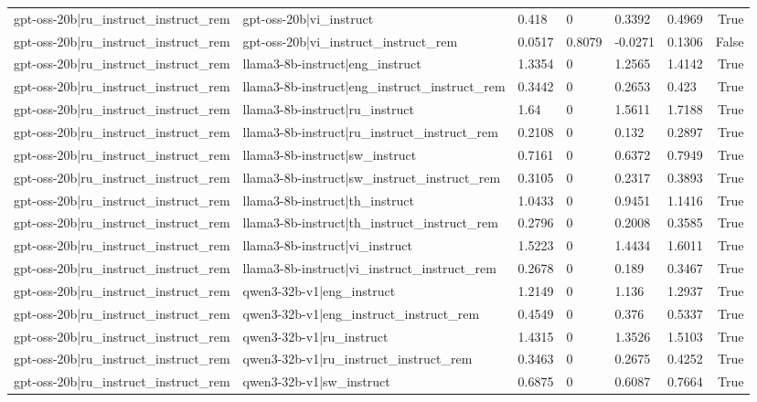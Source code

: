 \begin{table}
\begin{tabular}{llllllr}
gpt-oss-20b|ru_instruct_instruct_rem & gpt-oss-20b|vi_instruct & 0.418 & 0 & 0.3392 & 0.4969 & True \\
gpt-oss-20b|ru_instruct_instruct_rem & gpt-oss-20b|vi_instruct_instruct_rem & 0.0517 & 0.8079 & -0.0271 & 0.1306 & False \\
gpt-oss-20b|ru_instruct_instruct_rem & llama3-8b-instruct|eng_instruct & 1.3354 & 0 & 1.2565 & 1.4142 & True \\
gpt-oss-20b|ru_instruct_instruct_rem & llama3-8b-instruct|eng_instruct_instruct_rem & 0.3442 & 0 & 0.2653 & 0.423 & True \\
gpt-oss-20b|ru_instruct_instruct_rem & llama3-8b-instruct|ru_instruct & 1.64 & 0 & 1.5611 & 1.7188 & True \\
gpt-oss-20b|ru_instruct_instruct_rem & llama3-8b-instruct|ru_instruct_instruct_rem & 0.2108 & 0 & 0.132 & 0.2897 & True \\
gpt-oss-20b|ru_instruct_instruct_rem & llama3-8b-instruct|sw_instruct & 0.7161 & 0 & 0.6372 & 0.7949 & True \\
gpt-oss-20b|ru_instruct_instruct_rem & llama3-8b-instruct|sw_instruct_instruct_rem & 0.3105 & 0 & 0.2317 & 0.3893 & True \\
gpt-oss-20b|ru_instruct_instruct_rem & llama3-8b-instruct|th_instruct & 1.0433 & 0 & 0.9451 & 1.1416 & True \\
gpt-oss-20b|ru_instruct_instruct_rem & llama3-8b-instruct|th_instruct_instruct_rem & 0.2796 & 0 & 0.2008 & 0.3585 & True \\
gpt-oss-20b|ru_instruct_instruct_rem & llama3-8b-instruct|vi_instruct & 1.5223 & 0 & 1.4434 & 1.6011 & True \\
gpt-oss-20b|ru_instruct_instruct_rem & llama3-8b-instruct|vi_instruct_instruct_rem & 0.2678 & 0 & 0.189 & 0.3467 & True \\
gpt-oss-20b|ru_instruct_instruct_rem & qwen3-32b-v1|eng_instruct & 1.2149 & 0 & 1.136 & 1.2937 & True \\
gpt-oss-20b|ru_instruct_instruct_rem & qwen3-32b-v1|eng_instruct_instruct_rem & 0.4549 & 0 & 0.376 & 0.5337 & True \\
gpt-oss-20b|ru_instruct_instruct_rem & qwen3-32b-v1|ru_instruct & 1.4315 & 0 & 1.3526 & 1.5103 & True \\
gpt-oss-20b|ru_instruct_instruct_rem & qwen3-32b-v1|ru_instruct_instruct_rem & 0.3463 & 0 & 0.2675 & 0.4252 & True \\
gpt-oss-20b|ru_instruct_instruct_rem & qwen3-32b-v1|sw_instruct & 0.6875 & 0 & 0.6087 & 0.7664 & True \\

\end{tabular}
\end{table}
